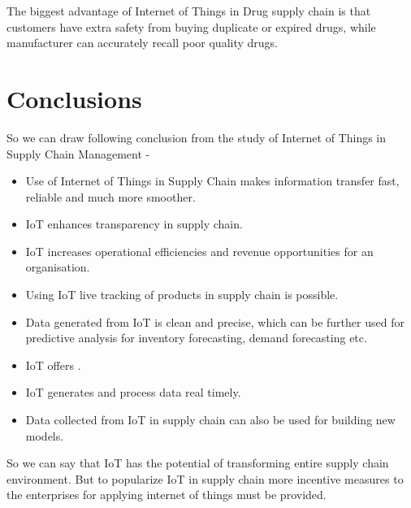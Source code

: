 \documentclass[12pt, a4paper]{report}
\begin{document}
The biggest advantage of Internet of Things in Drug supply chain is that customers have extra safety from buying duplicate or expired drugs, while manufacturer can accurately recall poor quality drugs.

\chapter{Conclusions}
So we can draw following conclusion from the study of Internet of Things in Supply Chain Management - 
\begin{itemize}
	\item Use of Internet of Things in Supply Chain makes information transfer fast, reliable and much more smoother.
	\item IoT enhances transparency in supply chain.
	\item IoT increases operational efficiencies and revenue opportunities for an organisation.
	\item Using IoT live tracking of products in supply chain is possible.
	\item Data generated from IoT is clean and precise, which can be further used for predictive analysis for inventory forecasting, demand forecasting etc.
	\item IoT offers .
	\item IoT generates and process data real timely.
	\item Data collected from IoT in supply chain can also be used for building new models.
\end{itemize}
So we can say that IoT has the potential of transforming entire supply chain environment. But to popularize IoT in supply chain more incentive measures to the enterprises for applying internet of things must be provided.\cite{yan2009supply}























\end{document}
